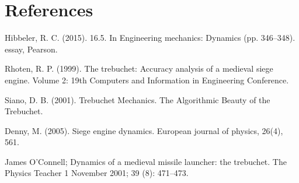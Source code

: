 \documentclass[12pt, titlepage]{article}
\begin{document}
    \section{References}
        \hspace{15pt}Hibbeler, R. C. (2015). 16.5. In Engineering mechanics: Dynamics (pp. 346–348). essay, Pearson.

        Rhoten, R. P. (1999). The trebuchet: Accuracy analysis of a medieval siege engine. Volume 2: 19th Computers and Information in Engineering Conference.

        Siano, D. B. (2001). Trebuchet Mechanics. The Algorithmic Beauty of the Trebuchet.

        Denny, M. (2005). Siege engine dynamics. European journal of physics, 26(4), 561.

        James O'Connell; Dynamics of a medieval missile launcher: the trebuchet. The Physics
        Teacher 1 November 2001; 39 (8): 471–473.
    \newpage
\end{document}
